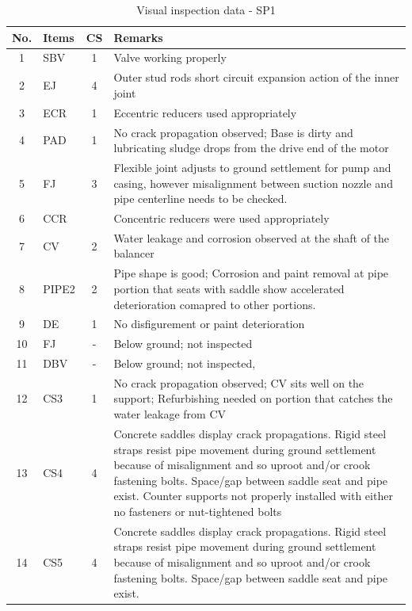 \begin{table}[!h]
	\caption{Visual inspection data - SP1}
	\label{ch04_visualinspectionsp1}
		{\scriptsize
\begin{tabular}{c|l|c|p{12cm}}
\hline
No. & Items & CS & Remarks \\ 
\hline
1 & SBV & 1 & Valve working properly  \\ 
2 & EJ & 4 & Outer stud rods short circuit expansion action of the inner joint \\ 
3 & ECR & 1 & Eccentric reducers used appropriately \\ 
4 & PAD & 1 & No crack propagation observed; Base is dirty and lubricating sludge drops from the drive end of the motor \\ 
5 & FJ & 3 & Flexible joint adjusts to ground settlement for pump and casing, however misalignment between suction nozzle and pipe centerline needs to be checked. \\ 
6 & CCR &  & Concentric reducers were used appropriately \\ 
7 & CV & 2 & Water leakage and corrosion observed at the shaft of the balancer \\ 
8 & PIPE2 & 2 & Pipe shape is good; Corrosion and paint removal at pipe portion that seats with saddle show accelerated deterioration comapred to other portions.  \\ 
9 & DE & 1 & No disfigurement or paint deterioration \\ 
10 & FJ & - & Below ground; not inspected \\ 
11 & DBV & - & Below ground; not inspected, \\ 
12 & CS3 & 1 & No crack propagation observed; CV sits well on the support; Refurbishing needed on portion that catches the water leakage from CV \\ 
13 & CS4 & 4 & Concrete saddles display crack propagations. Rigid steel straps resist pipe movement during ground settlement because of misalignment and so uproot and/or crook fastening bolts. Space/gap between saddle seat and pipe exist. Counter supports not properly installed with either no fasteners or nut-tightened bolts \\ 
14 & CS5 & 4 & Concrete saddles display crack propagations. Rigid steel straps resist pipe movement during ground settlement because of misalignment and so uproot and/or crook fastening bolts. Space/gap between saddle seat and pipe exist. \\ 
\hline
\end{tabular}
	}
\end{table}



